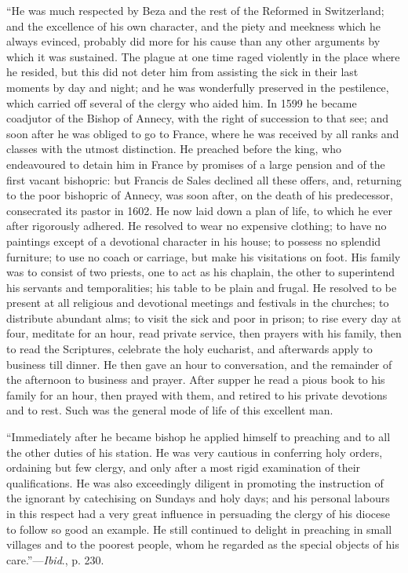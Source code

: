 ``He was much respected by Beza and the rest of the Reformed in
Switzerland; and the excellence of his own character, and the piety
and meekness which he always evinced, probably did more for his cause
than any other arguments by which it was sustained. The plague at one
time raged violently in the place where he resided, but this did not
deter him from assisting the sick in their last moments by day and
night; and he was wonderfully preserved in the pestilence, which
carried off several of the clergy who aided him. In 1599 he became
coadjutor of the Bishop of Annecy, with the right of succession to
that see; and soon after he was obliged to go to France, where he was
received by all ranks and classes with the utmost distinction. He
preached before the king, who endeavoured to detain him in France by
promises of a large pension and of the first vacant bishopric: but
Francis de Sales declined all these offers, and, returning to the poor
bishopric of Annecy, was soon after, on the death of his predecessor,
consecrated its pastor in 1602. He now laid down a plan of life, to
which he ever after rigorously adhered. He resolved to wear no
expensive clothing; to have no paintings except of a devotional
character in his house; to possess no
splendid furniture; to use no coach or carriage, but make his
visitations on foot. His family was to consist of two priests, one to
act as his chaplain, the other to superintend his servants and
temporalities; his table to be plain and frugal. He resolved to be
present at all religious and devotional meetings and festivals in the
churches; to distribute abundant alms; to visit the sick and poor in
prison; to rise every day at four, meditate for an hour, read private
service, then prayers with his family, then to read the Scriptures,
celebrate the holy eucharist, and afterwards apply to business till
dinner. He then gave an hour to conversation, and the remainder of the
afternoon to business and prayer. After supper he read a pious book to
his family for an hour, then prayed with them, and retired to his
private devotions and to rest. Such was the general mode of life of
this excellent man.

``Immediately after he became bishop he applied himself to
preaching and to all the other duties of his station. He was very
cautious in conferring holy orders, ordaining but few clergy, and only
after a most rigid examination of their qualifications. He was also
exceedingly diligent in promoting the instruction of the ignorant by
catechising on Sundays and holy days; and his personal labours in this
respect had a very great influence in persuading the clergy of his
diocese to follow so good an example. He still continued to delight in
preaching in small villages and to the poorest people, whom he
regarded as the special objects of his care.''—\emph{Ibid}., p.
230.

